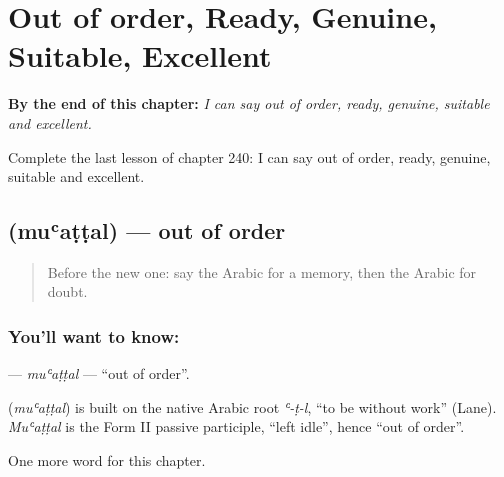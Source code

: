 
\chapter{Out of order, Ready, Genuine, Suitable, Excellent}
\label{ch:ar-out-of-order-ready-genuine-suitable-excellent}

\begin{chapteropening}
\textbf{By the end of this chapter:} \emph{I can say out of order, ready, genuine, suitable and excellent.}

Complete the last lesson of chapter 240: I can say out of order, ready, genuine, suitable and excellent.
\end{chapteropening}

\section[\texorpdfstring{\ar{معطل} (muʿaṭṭal)}{معطل (muʿaṭṭal)}]{ (muʿaṭṭal) — out of order}

\label{lesson:AR-C240-muattal}



\begin{quote}
Before the new one: say the Arabic for a memory, then the Arabic for doubt.
\end{quote}

\subsection*{You'll want to know: }
\textbf{} — \emph{muʿaṭṭal} — \textquotedblleft{}out of order\textquotedblright{}.

\begin{cousinweb}
\textbf{} (\emph{muʿaṭṭal}) is built on the native Arabic root \emph{ʿ-ṭ-l}, \textquotedblleft{}to be without work\textquotedblright{} (Lane). \emph{Muʿaṭṭal} is the Form II passive participle, \textquotedblleft{}left idle\textquotedblright{}, hence \textquotedblleft{}out of order\textquotedblright{}.
\end{cousinweb}

\begin{grammarlens}[title={What you've built}]
One more word for this chapter.
\end{grammarlens}

